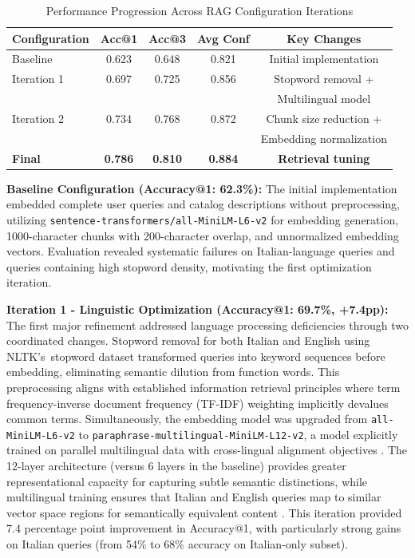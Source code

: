\begin{table}[htbp]
\centering
\begin{tabular}{lcccc}
\toprule
\textbf{Configuration} & \textbf{Acc@1} & \textbf{Acc@3} & \textbf{Avg Conf} & \textbf{Key Changes} \\
\midrule
Baseline & 0.623 & 0.648 & 0.821 & Initial implementation \\
Iteration 1 & 0.697 & 0.725 & 0.856 & Stopword removal + \\
& & & & Multilingual model \\
Iteration 2 & 0.734 & 0.768 & 0.872 & Chunk size reduction + \\
& & & & Embedding normalization \\
\textbf{Final} & \textbf{0.786} & \textbf{0.810} & \textbf{0.884} & \textbf{Retrieval tuning} \\
\bottomrule
\end{tabular}
\caption{Performance Progression Across RAG Configuration Iterations}
\label{tab:iterative_optimization}
\end{table}

\textbf{Baseline Configuration (Accuracy@1: 62.3\%):} The initial implementation embedded complete user queries and catalog descriptions without preprocessing, utilizing \texttt{sentence-transformers/all-MiniLM-L6-v2} for embedding generation, 1000-character chunks with 200-character overlap, and unnormalized embedding vectors. Evaluation revealed systematic failures on Italian-language queries and queries containing high stopword density, motivating the first optimization iteration.

\textbf{Iteration 1 - Linguistic Optimization (Accuracy@1: 69.7\%, +7.4pp):} The first major refinement addressed language processing deficiencies through two coordinated changes. Stopword removal for both Italian and English using NLTK's~stopword dataset transformed queries into keyword sequences before embedding, eliminating semantic dilution from function words. This preprocessing aligns with established information retrieval principles \cite{manning2008introduction} where term frequency-inverse document frequency (TF-IDF) weighting implicitly devalues common terms. Simultaneously, the embedding model was upgraded from \texttt{all-MiniLM-L6-v2} to \texttt{paraphrase-multilingual-MiniLM-L12-v2}, a model explicitly trained on parallel multilingual data with cross-lingual alignment objectives \cite{reimers2019sentencebertsentenceembeddingsusing} \cite{wang2020minilm}. The 12-layer architecture (versus 6 layers in the baseline) provides greater representational capacity for capturing subtle semantic distinctions, while multilingual training ensures that Italian and English queries map to similar vector space regions for semantically equivalent content \cite{wang2020minilm}. This iteration provided 7.4 percentage point improvement in Accuracy@1, with particularly strong gains on Italian queries (from 54\% to 68\% accuracy on Italian-only subset).

